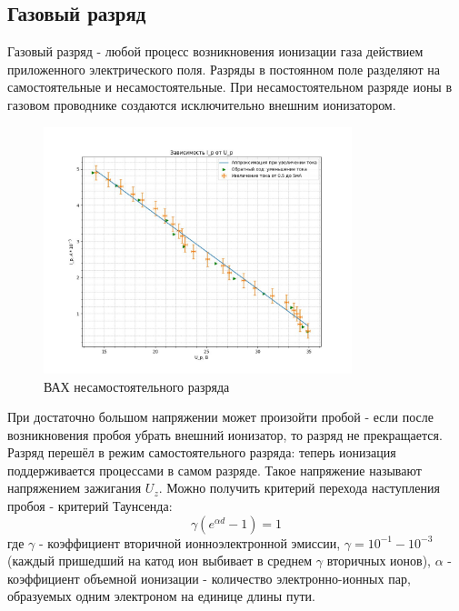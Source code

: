 \documentclass[a4paper,12pt]{article}
\begin{document}
    \subsection*{Газовый разряд}
    Газовый разряд - любой процесс возникновения ионизации газа действием приложенного электрического поля. Разряды в постоянном поле разделяют на самостоятельные и несамостоятельные. При несамостоятельном разряде ионы в газовом проводнике создаются исключительно внешним ионизатором.

    \begin{figure}[!h]
        \begin{center}
            \includegraphics[width = 0.8\textwidth]{photo_2024-12-14_02-15-42.jpg}
        \end{center}
        \caption{ВАХ несамостоятельного разряда}
    \end{figure}
    
    При достаточно большом напряжении может произойти пробой - если после возникновения пробоя убрать внешний ионизатор, то разряд не прекращается. Разряд перешёл в режим самостоятельного разряда: теперь ионизация поддерживается процессами в самом разряде. Такое напряжение называют напряжением зажигания $U_{z}$. 
    \newline
    Можно получить критерий перехода наступления пробоя - критерий Таунсенда:
    \begin{equation}
        \gamma (e^{\alpha d} - 1) = 1
    \end{equation}
    где $\gamma$ - коэффициент вторичной ионноэлектронной эмиссии, $\gamma = 10^{-1} - 10^{-3}$ (каждый пришедший на катод ион выбивает в среднем $\gamma$ вторичных ионов), $\alpha$ - коэффициент объемной ионизации - количество электронно-ионных пар, образуемых одним электроном на единице длины пути.
    
\end{document}
